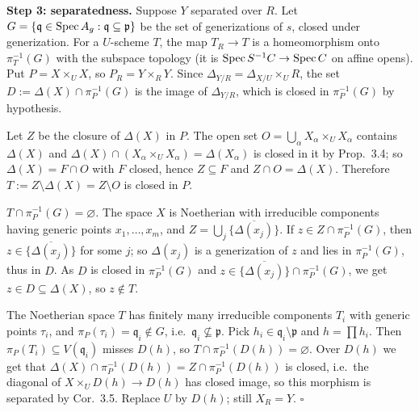 \documentclass[11pt]{article}
\begin{document}
\textbf{Step 3: separatedness.} Suppose $Y$ separated over $R$. Let $G=\{\mathfrak q\in\operatorname{Spec} A_g:\mathfrak q\subseteq\mathfrak p\}$ be the set of generizations of $s$, closed under generization. For a $U$-scheme $T$, the map $T_R\to T$ is a homeomorphism onto $\pi_T^{-1}(G)$ with the subspace topology (it is $\operatorname{Spec} S^{-1}C\to\operatorname{Spec} C$ on affine opens). Put $P=X\times_UX$, so $P_R=Y\times_RY$. Since $\Delta_{Y/R}=\Delta_{X/U}\times_UR$, the set $D:=\Delta(X)\cap\pi_P^{-1}(G)$ is the image of $\Delta_{Y/R}$, which is closed in $\pi_P^{-1}(G)$ by hypothesis.

Let $Z$ be the closure of $\Delta(X)$ in $P$. The open set $O=\bigcup_\alpha X_\alpha\times_UX_\alpha$ contains $\Delta(X)$ and $\Delta(X)\cap(X_\alpha\times_UX_\alpha)=\Delta(X_\alpha)$ is closed in it by Prop.~3.4; so $\Delta(X)=F\cap O$ with $F$ closed, hence $Z\subseteq F$ and $Z\cap O=\Delta(X)$. Therefore $T:=Z\setminus\Delta(X)=Z\setminus O$ is closed in $P$.

\emph{$T\cap\pi_P^{-1}(G)=\varnothing$.} The space $X$ is Noetherian with irreducible components having generic points $x_1,\dots,x_m$, and $Z=\bigcup_j\overline{\{\Delta(x_j)\}}$. If $z\in Z\cap\pi_P^{-1}(G)$, then $z\in\overline{\{\Delta(x_j)\}}$ for some $j$; so $\Delta(x_j)$ is a generization of $z$ and lies in $\pi_P^{-1}(G)$, thus in $D$. As $D$ is closed in $\pi_P^{-1}(G)$ and $z\in\overline{\{\Delta(x_j)\}}\cap\pi_P^{-1}(G)$, we get $z\in D\subseteq\Delta(X)$, so $z\notin T$.

The Noetherian space $T$ has finitely many irreducible components $T_i$ with generic points $\tau_i$, and $\pi_P(\tau_i)=\mathfrak q_i\notin G$, i.e.\ $\mathfrak q_i\not\subseteq\mathfrak p$. Pick $h_i\in\mathfrak q_i\setminus\mathfrak p$ and $h=\prod h_i$. Then $\pi_P(T_i)\subseteq V(\mathfrak q_i)$ misses $D(h)$, so $T\cap\pi_P^{-1}(D(h))=\varnothing$. Over $D(h)$ we get that $\Delta(X)\cap\pi_P^{-1}(D(h))=Z\cap\pi_P^{-1}(D(h))$ is closed, i.e.\ the diagonal of $X\times_UD(h)\to D(h)$ has closed image, so this morphism is separated by Cor.~3.5. Replace $U$ by $D(h)$; still $X_R=Y$. \hfill$\square$
\end{document}
